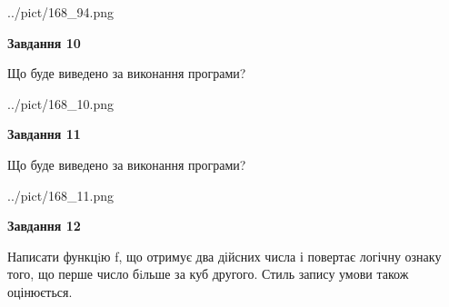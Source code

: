 \documentclass[12pt, ukrainian]{article}
\begin{document}
{\begin {large}
\begin{center}
	{../pict/168_94.png}
\end{center}
\newpage

{\begin {center}\textbf{Завдання 10}\end {center}}

Що буде виведено за виконання програми?\par
\begin{center}
	{../pict/168_10.png}
\end{center}
\newpage

{\begin {center}\textbf{Завдання 11}\end {center}}

Що буде виведено за виконання програми?\par
\begin{center}
	{../pict/168_11.png}
\end{center}
\newpage

{\begin {center}\textbf{Завдання 12}\end {center}}


Написати функцiю f, що отримує два дійсних числа і повертає логічну ознаку того, що перше число бiльше за куб другого. Стиль запису умови також оцінюється.\par
\newpage

\end {large}}
\end{document}
